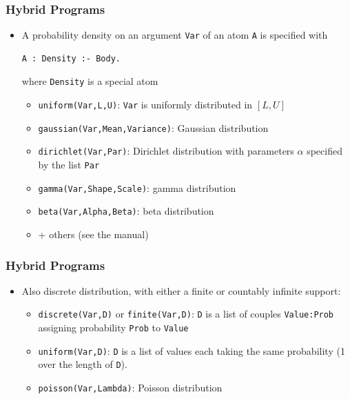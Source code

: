 \documentclass[trans]{beamer}
\begin{document}
\begin{frame}[fragile]
  \frametitle{Hybrid Programs}
\begin{itemize}
\item A probability density on an argument \verb|Var| of an atom \verb|A| is specified with
\begin{verbatim}
A : Density :- Body.
\end{verbatim}
where \verb|Density| is a special atom 
\begin{itemize}
\item 
\verb|uniform(Var,L,U)|: \verb|Var|  is uniformly distributed in $[L,U]$
\item 
\verb|gaussian(Var,Mean,Variance)|:  Gaussian distribution 
\item 
\verb|dirichlet(Var,Par)|:  Dirichlet distribution with parameters $\alpha$ specified by the list \verb|Par|
\item 
\verb|gamma(Var,Shape,Scale)|: gamma distribution 
\item 
\verb|beta(Var,Alpha,Beta)|:  beta distribution 
\item + others (see the manual)
\end{itemize}
\end{itemize}
\end{frame}

\begin{frame}[fragile]
  \frametitle{Hybrid Programs}
  \begin{itemize}
\item 
Also discrete distribution, with either a finite or countably infinite support:
\begin{itemize}
\item 
\verb|discrete(Var,D)| or \verb|finite(Var,D)|:  \verb|D| is a list of couples \verb|Value:Prob| assigning probability \verb|Prob| to \verb|Value|
\item 
\verb|uniform(Var,D)|: \verb|D|  is a list of values each taking the same probability (1 over the length of \verb|D|).
\item 
\verb|poisson(Var,Lambda)|: Poisson distribution 
\end{itemize}
\end{itemize}
\end{frame}
\end{document}

